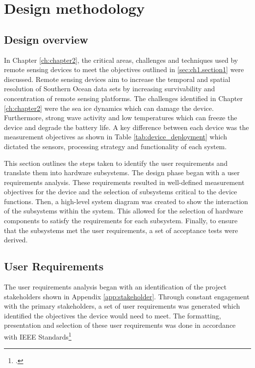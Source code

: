 
\chapter{Design methodology}
\label{ch:ch3}
\section{Design overview}
\label{sec:ch3_design}

In Chapter \ref{ch:chapter2}, the critical areas, challenges and techniques used by remote sensing devices to meet the objectives outlined in \ref{sec:ch1.section1} were discussed.  Remote sensing devices aim to increase the temporal and spatial resolution of Southern Ocean data sets by increasing survivability and concentration of remote sensing platforms. The challenges identified in Chapter \ref{ch:chapter2} were the sea ice dynamics which can damage the device. Furthermore, strong wave activity and low temperatures which can freeze the device and degrade the battery life. A key difference between each device was the measurement objectives as shown in Table \ref{tab:device_deployment} which dictated the sensors, processing strategy and functionality of each system. \par

This section outlines the steps taken to identify the user requirements and translate them into hardware subsystems. The design phase began with a user requirements analysis. These requirements resulted in well-defined measurement objectives for the device and the selection of subsystems critical to the device functions. Then, a high-level system diagram was created to show the interaction of the subsystems within the system. This allowed for the selection of hardware components to satisfy the requirements for each subsystem. Finally, to ensure that the subsystems met the user requirements, a set of acceptance tests were derived. 


\section{User Requirements}
\label{sec:sec3_UR}

The user requirements analysis began with an identification of the project stakeholders shown in Appendix \ref{app:stakeholder}. Through constant engagement with the primary stakeholders, a set of user requirements was generated which identified the objectives the device would need to meet. The formatting, presentation and selection of these user requirements was done in accordance with IEEE Standards\footcite{IEEE_STD_UREQ}

